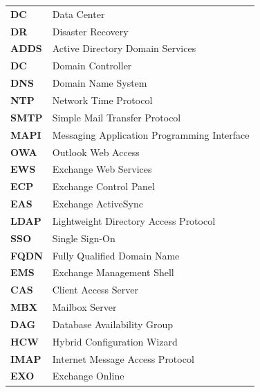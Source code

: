 \documentclass[reqno,12pt,oneside]{report} %
\theoremstyle{plain}
\theoremstyle{definition}
\theoremstyle{remark}
\numberwithin{theorem}{chapter}     %
\begin{document}
\begin{tabular}{p{2.5cm}p{10cm}}
\textbf{DC}  & Data Center\\
\textbf{DR}  & Disaster Recovery \\
\textbf{ADDS}  & Active Directory Domain Services \\
\textbf{DC}  & Domain Controller \\ 
\textbf{DNS}  & Domain Name System \\ 
\textbf{NTP}  & Network Time Protocol \\ 
\textbf{SMTP}  & Simple Mail Transfer Protocol \\ 
\textbf{MAPI}  & Messaging Application Programming Interface \\ 
\textbf{OWA}  & Outlook Web Access \\ 
\textbf{EWS}  & Exchange Web Services \\ 
\textbf{ECP}  & Exchange Control Panel \\ 
\textbf{EAS}  & Exchange ActiveSync \\ 
\textbf{LDAP}  & Lightweight Directory Access Protocol \\ 
\textbf{SSO}  & Single Sign-On \\ 
\textbf{FQDN}  & Fully Qualified Domain Name \\ 
\textbf{EMS}  & Exchange Management Shell \\ 
\textbf{CAS}  & Client Access Server \\ 
\textbf{MBX}  & Mailbox Server \\ 
\textbf{DAG}  & Database Availability Group \\ 
\textbf{HCW}  & Hybrid Configuration Wizard \\ 
\textbf{IMAP}  & Internet Message Access Protocol \\ 
\textbf{EXO}  & Exchange Online \\ 

\end{tabular}




%
\listoffigures   %
\tableofcontents     %

\printnomenclature[1.5cm]

\end{document}
